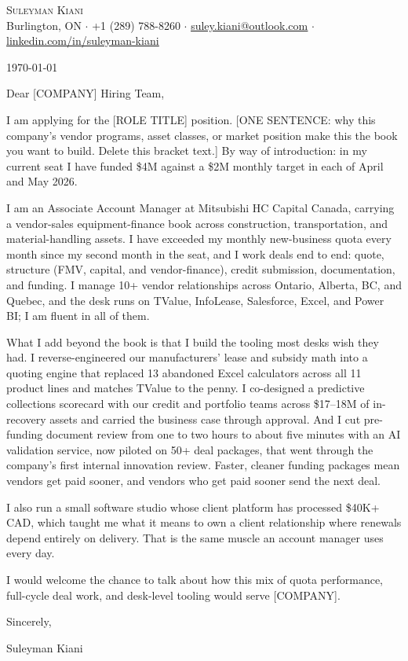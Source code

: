 \documentclass[letterpaper,11pt]{article}
\newcommand{\company}{[COMPANY]}
\newcommand{\role}{[ROLE TITLE]}
\newcommand{\hook}{[ONE SENTENCE: why this company's vendor programs, asset classes, or market position make this the book you want to build. Delete this bracket text.]}
\begin{document}
\begin{center}
    {\Huge \scshape Suleyman Kiani} \\ \vspace{3pt}
    \small Burlington, ON $\cdot$ +1 (289) 788-8260 $\cdot$ \href{mailto:suley.kiani@outlook.com}{\underline{suley.kiani@outlook.com}} $\cdot$ \href{https://www.linkedin.com/in/suleyman-kiani}{\underline{linkedin.com/in/suleyman-kiani}}
\end{center}

\vspace{8pt}
\today

Dear \company{} Hiring Team,

I am applying for the \role{} position. \hook{} By way of introduction: in my current seat I have funded \$4M against a \$2M monthly target in each of April and May 2026.

I am an Associate Account Manager at Mitsubishi HC Capital Canada, carrying a vendor-sales equipment-finance book across construction, transportation, and material-handling assets. I have exceeded my monthly new-business quota every month since my second month in the seat, and I work deals end to end: quote, structure (FMV, capital, and vendor-finance), credit submission, documentation, and funding. I manage 10+ vendor relationships across Ontario, Alberta, BC, and Quebec, and the desk runs on TValue, InfoLease, Salesforce, Excel, and Power BI; I am fluent in all of them.

What I add beyond the book is that I build the tooling most desks wish they had. I reverse-engineered our manufacturers' lease and subsidy math into a quoting engine that replaced 13 abandoned Excel calculators across all 11 product lines and matches TValue to the penny. I co-designed a predictive collections scorecard with our credit and portfolio teams across \$17--18M of in-recovery assets and carried the business case through approval. And I cut pre-funding document review from one to two hours to about five minutes with an AI validation service, now piloted on 50+ deal packages, that went through the company's first internal innovation review. Faster, cleaner funding packages mean vendors get paid sooner, and vendors who get paid sooner send the next deal.

I also run a small software studio whose client platform has processed \$40K+ CAD, which taught me what it means to own a client relationship where renewals depend entirely on delivery. That is the same muscle an account manager uses every day.

I would welcome the chance to talk about how this mix of quota performance, full-cycle deal work, and desk-level tooling would serve \company{}.

Sincerely,

Suleyman Kiani
\end{document}
